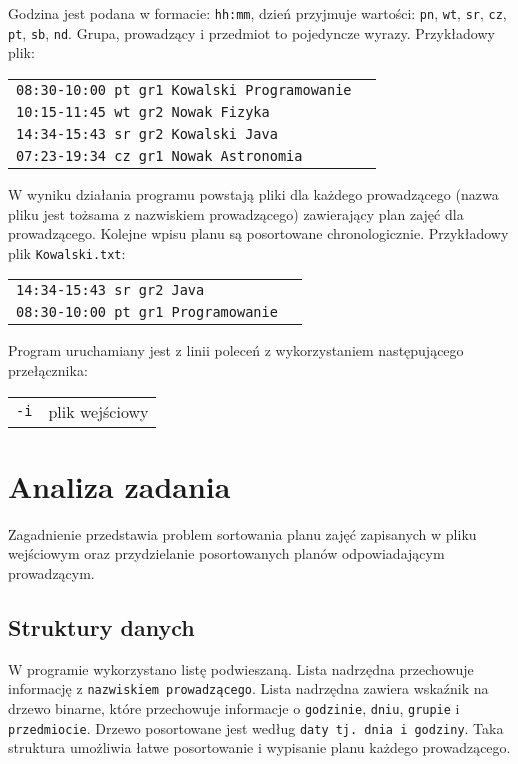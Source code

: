 \documentclass[12pt,a4paper,twoside]{article}
\let\oldmarginpar\marginpar
\renewcommand\marginpar[1]{%
  {\linespread{0.85}\normalfont\scriptsize%
\oldmarginpar[\hspace{1cm}\begin{minipage}{3cm}\raggedleft\scriptsize\color{black}\textsf{#1}\end{minipage}]%
{\hspace{0cm}\begin{minipage}{3cm}\raggedright\scriptsize\color{black}\textsf{#1}\end{minipage}}%
}%
}
\begin{document}
\noindent Godzina jest podana w formacie: \texttt{hh:mm}, dzień przyjmuje wartości: \texttt{pn}, \texttt{wt}, \texttt{sr}, \texttt{cz}, \texttt{pt}, \texttt{sb}, \texttt{nd}. Grupa,
prowadzący i przedmiot to pojedyncze wyrazy. Przykładowy plik: \newline

\begin{tabular}{ll}
\texttt{08:30-10:00 pt gr1 Kowalski Programowanie} \\
\texttt{10:15-11:45 wt gr2 Nowak Fizyka} \\
\texttt{14:34-15:43 sr gr2 Kowalski Java} \\
\texttt{07:23-19:34 cz gr1 Nowak Astronomia} \\
\end{tabular} \newline

\noindent W wyniku działania programu powstają pliki dla każdego prowadzącego (nazwa pliku jest tożsama z
nazwiskiem prowadzącego) zawierający plan zajęć dla prowadzącego. Kolejne wpisu planu są posortowane chronologicznie. Przykładowy plik \texttt{Kowalski.txt}: \newline

\begin{tabular}{ll}
\texttt{14:34-15:43 sr gr2 Java} \\
\texttt{08:30-10:00 pt gr1 Programowanie} \\
\end{tabular} \newline

Program uruchamiany jest z linii poleceń z wykorzystaniem następującego przełącznika: \\
\begin{tabular}{ll}
\indent \texttt{-i} & plik wejściowy \\
\end{tabular}

\section{Analiza zadania}
\marginpar{}

Zagadnienie przedstawia problem sortowania planu zajęć zapisanych w pliku wejściowym oraz przydzielanie posortowanych planów odpowiadającym prowadzącym.

\subsection{Struktury danych}
\marginpar{}
W programie wykorzystano listę podwieszaną. Lista nadrzędna przechowuje informację z \texttt{nazwiskiem prowadzącego}. Lista nadrzędna zawiera wskaźnik na drzewo binarne, które przechowuje informacje o \texttt{godzinie}, \texttt{dniu}, \texttt{grupie} i \texttt{przedmiocie}. Drzewo posortowane jest według \texttt{daty tj. dnia i godziny}. Taka struktura umożliwia łatwe posortowanie i wypisanie planu każdego prowadzącego.
\end{document}
